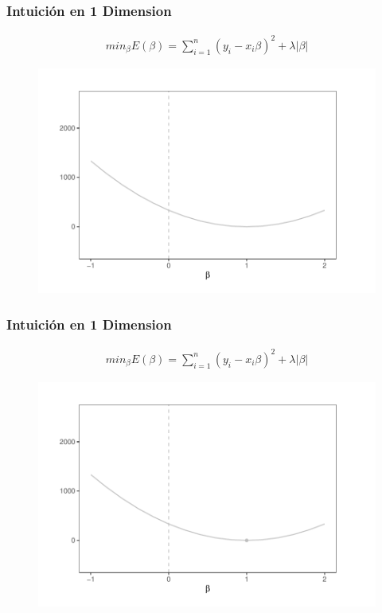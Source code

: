 \documentclass[
  shownotes,
  xcolor={svgnames},
  hyperref={colorlinks,citecolor=DarkBlue,linkcolor=DarkRed,urlcolor=DarkBlue}
  , aspectratio=169]{beamer}
\begin{document}
\begin{frame}[fragile]
\frametitle{Intuición en 1 Dimension}

\begin{align}
 min_{\beta} E(\beta) = \sum_{i=1}^n (y_i-x_i \beta)^2 + \lambda|\beta| 
\end{align}
   \begin{figure}[H] \centering
            \captionsetup{justification=centering}
              \includegraphics[scale=0.6]{figures/lasso0.pdf}
 \end{figure}



\end{frame}
\begin{frame}[fragile]
\frametitle{Intuición en 1 Dimension}

\begin{align}
 min_{\beta} E(\beta) = \sum_{i=1}^n (y_i-x_i \beta)^2 + \lambda|\beta| 
\end{align}
   \begin{figure}[H] \centering
            \captionsetup{justification=centering}
              \includegraphics[scale=0.6]{figures/lasso1.pdf}
 \end{figure}




\end{frame}
\end{document}
